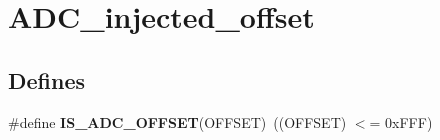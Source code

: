 \hypertarget{group__ADC__injected__offset}{
\section{ADC\_\-injected\_\-offset}
\label{group__ADC__injected__offset}
}
\subsection*{Defines}
\begin{DoxyCompactItemize}
\item 
\hypertarget{group__ADC__injected__offset_ga252eaf5d2552f0d11b1bcca7dc48950a}{
\#define {\bfseries IS\_\-ADC\_\-OFFSET}(OFFSET)~((OFFSET) $<$= 0xFFF)}
\label{group__ADC__injected__offset_ga252eaf5d2552f0d11b1bcca7dc48950a}

\end{DoxyCompactItemize}
